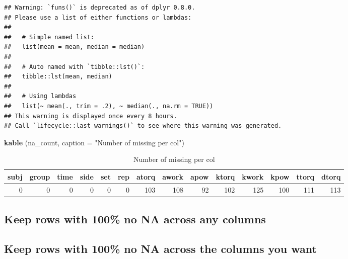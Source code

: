 \documentclass[
]{book}
\newenvironment{Shaded}{\begin{snugshade}}{\end{snugshade}}
\newcommand{\DataTypeTok}[1]{\textcolor[rgb]{0.13,0.29,0.53}{#1}}
\newcommand{\KeywordTok}[1]{\textcolor[rgb]{0.13,0.29,0.53}{\textbf{#1}}}
\newcommand{\NormalTok}[1]{#1}
\newcommand{\OperatorTok}[1]{\textcolor[rgb]{0.81,0.36,0.00}{\textbf{#1}}}
\newcommand{\StringTok}[1]{\textcolor[rgb]{0.31,0.60,0.02}{#1}}
\begin{document}
\begin{verbatim}
## Warning: `funs()` is deprecated as of dplyr 0.8.0.
## Please use a list of either functions or lambdas: 
## 
##   # Simple named list: 
##   list(mean = mean, median = median)
## 
##   # Auto named with `tibble::lst()`: 
##   tibble::lst(mean, median)
## 
##   # Using lambdas
##   list(~ mean(., trim = .2), ~ median(., na.rm = TRUE))
## This warning is displayed once every 8 hours.
## Call `lifecycle::last_warnings()` to see where this warning was generated.
\end{verbatim}

\begin{Shaded}
\begin{Highlighting}[]
\KeywordTok{kable}\NormalTok{ (na_count, }\DataTypeTok{caption =} \StringTok{"Number of missing per col"}\NormalTok{) }
\end{Highlighting}
\end{Shaded}

\begin{table}

\caption{\label{tab:unnamed-chunk-18}Number of missing per col}
\centering
\begin{tabular}[t]{r|r|r|r|r|r|r|r|r|r|r|r|r|r}
\hline
subj & group & time & side & set & rep & atorq & awork & apow & ktorq & kwork & kpow & ttorq & dtorq\\
\hline
0 & 0 & 0 & 0 & 0 & 0 & 103 & 108 & 92 & 102 & 125 & 100 & 111 & 113\\
\hline
\end{tabular}
\end{table}

\hypertarget{keep-rows-with-100-no-na-across-any-columns}{%
\subsection{Keep rows with 100\% no NA across any columns}\label{keep-rows-with-100-no-na-across-any-columns}}

\begin{Shaded}
\end{Shaded}

\hypertarget{keep-rows-with-100-no-na-across-the-columns-you-want}{%
\subsection{Keep rows with 100\% no NA across the columns you want}\label{keep-rows-with-100-no-na-across-the-columns-you-want}}
\end{document}
